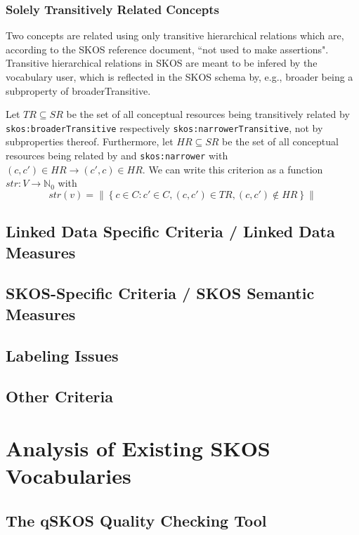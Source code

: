 \documentclass{llncs}
\begin{document}
\subsubsection{Solely Transitively Related Concepts} Two concepts are related using only transitive hierarchical relations which are, according to the SKOS reference document, ``not used to make assertions". Transitive hierarchical relations in SKOS are meant to be infered by the vocabulary user, which is reflected in the SKOS schema by, e.g., broader being a subproperty of broaderTransitive.

\begin{definition}
Let \(TR \subseteq SR\) be the set of all conceptual resources being transitively related by \texttt{skos:broaderTransitive} respectively \texttt{skos:narrowerTransitive}, not by subproperties thereof. Furthermore, let \(HR \subseteq SR\) be the set of all conceptual resources being related by  and \texttt{skos:narrower} with \((c,c') \in HR \rightarrow (c',c) \in HR\). We can write this criterion as a function \(str:V \rightarrow \mathbb{N}_{0}\) with \[str(v)=\left\|\left\{c \in C : c' \in C, (c,c') \in TR, (c,c') \notin HR\right\}\right\|\]
\end{definition}

\subsection{Linked Data Specific Criteria / Linked Data Measures}

\subsection{SKOS-Specific Criteria / SKOS Semantic Measures}

\subsection{Labeling Issues}

\subsection{Other Criteria}

\section{Analysis of Existing SKOS Vocabularies}

\subsection{The qSKOS Quality Checking Tool}
\end{document}
